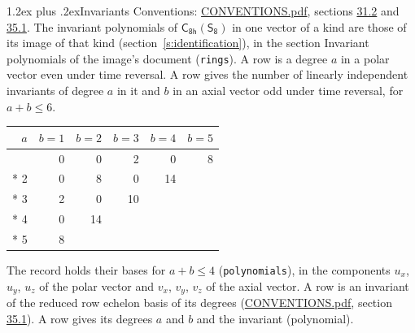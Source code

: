 \documentclass[10pt,a4paper]{article}
\makeatletter
\renewcommand\section{\@startsection{section}{1}{\z@}{-3ex plus -1ex minus -.2ex}%
  {1.2ex plus .2ex}{\normalfont\large\sffamily\bfseries\color{parttitle}}}
\numberwithin{equation}{section}
\newcommand{\grp}[1]{\mathsf{#1}}
\makeatother
\begin{document}
\section{Invariants}\label{s:invariants}
Conventions: \href{../../CONVENTIONS.pdf}{CONVENTIONS.pdf}, sections \href{../../CONVENTIONS.pdf\#conv.31.2}{31.2} and \href{../../CONVENTIONS.pdf\#conv.35.1}{35.1}.
The invariant polynomials of $\grp{C_{8h}}(\grp{S_{8}})$ in one vector of a kind are those of its image of that kind (section~\ref{s:identification}), in the section Invariant polynomials of the image's document (\texttt{rings}).
\leavevmode\label{n:index.degree.polar}\label{n:index.degree.axial}A row is a degree $a$ in a polar vector even under time reversal. A row gives the number of linearly independent invariants of degree $a$ in it and $b$ in an axial vector odd under time reversal, for $a + b \le 6$.
{\small\begin{longtable}{@{}rrrrrr@{}}\toprule
$a$ & $b = 1$ & $b = 2$ & $b = 3$ & $b = 4$ & $b = 5$\\\midrule\endhead
\bottomrule\endfoot\endlastfoot
1 & 0 & 0 & 2 & 0 & 8\\*
2 & 0 & 8 & 0 & 14 & \\*
3 & 2 & 0 & 10 &  & \\*
4 & 0 & 14 &  &  & \\*
5 & 8 &  &  &  & \\
\bottomrule\end{longtable}}
\leavevmode\label{n:local.component.polar}\label{n:local.component.axial}The record holds their bases for $a + b \le 4$ (\texttt{polynomials}), in the components $u_{x}$, $u_{y}$, $u_{z}$ of the polar vector and $v_{x}$, $v_{y}$, $v_{z}$ of the axial vector. \label{n:head.polynomial}A row is an invariant of the reduced row echelon basis of its degrees (\href{../../CONVENTIONS.pdf}{CONVENTIONS.pdf}, section \href{../../CONVENTIONS.pdf\#conv.35.1}{35.1}). A row gives its degrees $a$ and $b$ and the invariant (polynomial).
\end{document}
